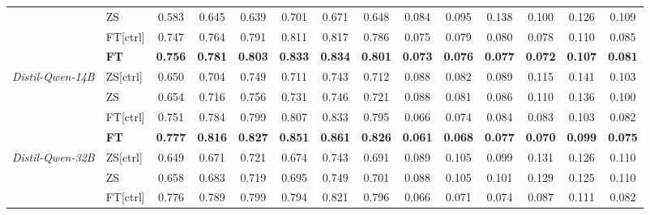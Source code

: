 \begin{table*}[!]
{\begin{tabular}{l|l|ccccc|c|ccccc|c}
& ZS & 0.583 & 0.645 & 0.639 & 0.701 & 0.671 & 0.648 & 0.084 & 0.095 & 0.138 & 0.100 & 0.126 & 0.109 \\
& FT[ctrl] & 0.747 & 0.764 & 0.791 & 0.811 & 0.817 & 0.786 & 0.075 & 0.079 & 0.080 & 0.078 & 0.110 & 0.085 \\
& \cellcolor{customgray}\textbf{FT} & 
\cellcolor{customgray}\textbf{0.756} & 
\cellcolor{customgray}\textbf{0.781} & 
\cellcolor{customgray}\textbf{0.803} & 
\cellcolor{customgray}\textbf{0.833} & 
\cellcolor{customgray}\textbf{0.834} & 
\cellcolor{customgray}\textbf{0.801} & 
\cellcolor{customgray}\textbf{0.073} & 
\cellcolor{customgray}\textbf{0.076} & 
\cellcolor{customgray}\textbf{0.077} & 
\cellcolor{customgray}\textbf{0.072} & 
\cellcolor{customgray}\textbf{0.107} & 
\cellcolor{customgray}\textbf{0.081} \\  \midrule
\multirow{4}{*}{\textit{Distil-Qwen-14B}} & 
ZS[ctrl] & 0.650 & 0.704 & 0.749 & 0.711 & 0.743 & 0.712 & 0.088 & 0.082 & 0.089 & 0.115 & 0.141 & 0.103 \\
& ZS  & 0.654 & 0.716 & 0.756 & 0.731 & 0.746 & 0.721 & 0.088 & 0.081 & 0.086 & 0.110 & 0.136 & 0.100 \\
& FT[ctrl] & 0.751 & 0.784 & 0.799 & 0.807 & 0.833 & 0.795 & 0.066 & 0.074 & 0.084 & 0.083 & 0.103 & 0.082 \\
& \cellcolor{customgray}\textbf{FT} & 
\cellcolor{customgray}\textbf{0.777} & 
\cellcolor{customgray}\textbf{0.816} & 
\cellcolor{customgray}\textbf{0.827} & 
\cellcolor{customgray}\textbf{0.851} & 
\cellcolor{customgray}\textbf{0.861} & 
\cellcolor{customgray}\textbf{0.826} & 
\cellcolor{customgray}\textbf{0.061} & 
\cellcolor{customgray}\textbf{0.068} & 
\cellcolor{customgray}\textbf{0.077} & 
\cellcolor{customgray}\textbf{0.070} & 
\cellcolor{customgray}\textbf{0.099} & 
\cellcolor{customgray}\textbf{0.075} \\ \midrule
\multirow{4}{*}{\textit{Distil-Qwen-32B}} & ZS[ctrl]  & 0.649 & 0.671 & 0.721 & 0.674 & 0.743 & 0.691 & 0.089 & 0.105 & 0.099 & 0.131 & 0.126 & 0.110 \\
& ZS   & 0.658 & 0.683 & 0.719 & 0.695 & 0.749 & 0.701 & 0.088 & 0.105 & 0.101 & 0.129 & 0.125 & 0.110 \\
& FT[ctrl]  & 0.776 & 0.789 & 0.799 & 0.794 & 0.821 & 0.796 & 0.066 & 0.071 & 0.074 & 0.087 & 0.111 & 0.082 \\

\end{tabular}}
\end{table*}
